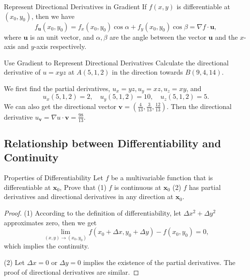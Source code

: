 \begin{proposition}{Represent Directional Derivatives in Gradient}{}
  If $f(x, y)$ is differentiable at $(x_0, y_0)$,
  then we have
  \begin{equation}
    f_{\mathbf{u}}(x_0, y_0) = f_x(x_0, y_0) \cos \alpha + f_y(x_0, y_0) \cos \beta = \nabla f \cdot \mathbf{u},
  \end{equation}
  where $\mathbf{u}$ is an unit vector, and $\alpha, \beta$ are the angle
  between the vector $\mathbf{u}$ and the $x$-axis and $y$-axis respectively.
\end{proposition}

\begin{example}{Use Gradient to Represent Directional Derivatives}{}
  Calculate the directional derivative of $u = xyz$
  at $A(5,1,2)$ in the direction towards $B(9,4,14)$.
\end{example}

\begin{solution}
  We first find the partial derivatives,
  $u_x = yz, u_y = xz, u_z = xy$, and 
  \begin{equation}
    u_x(5, 1, 2) = 2, \quad
    u_y(5, 1, 2) = 10, \quad
    u_z(5, 1, 2) = 5.
  \end{equation}
  We can also get the directional vector $\mathbf{v} = (\frac{4}{13},
  \frac{3}{13}, \frac{12}{13})$.
  Then the directional derivative $u_{\mathbf{v}} = \nabla u \cdot \mathbf{v} = \frac{98}{13}$.
\end{solution}

\subsection{Relationship between Differentiability and Continuity}

\begin{proposition}{Properties of Differentiability}{}
  Let $f$ be a multivariable function that is differentiable at $\mathbf{x}_0$,
  Prove that (1) $f$ is continuous at $\mathbf{x}_0$
  (2) $f$ has partial derivatives and directional derivatives in any direction
  at $\mathbf{x}_0$.
\end{proposition}

\begin{proof}
  (1) According to the definition of differentiability,
  let $\Delta x^2 + \Delta y^2$ approximates zero, then we get
  \begin{equation}
    \lim \limits _{(x,y) \rightarrow (x_0, y_0)} f(x_0 + \Delta x, y_0 + \Delta y) - f(x_0, y_0) 
    = 0,
  \end{equation}
  which implies the continuity.

  (2) Let $\Delta x = 0$ or $\Delta y = 0$ implies the existence of the partial
  derivatives. The proof of directional derivatives are similar.
\end{proof}

